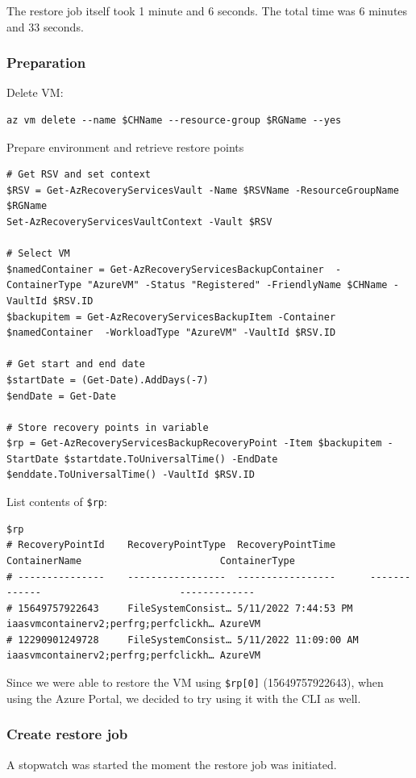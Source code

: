The restore job itself took 1 minute and 6 seconds.
The total time was 6 minutes and 33 seconds.

\subsubsection{Preparation}
\label{sec:org012927e}
Delete VM:
\begin{verbatim}
az vm delete --name $CHName --resource-group $RGName --yes
\end{verbatim}

Prepare environment and retrieve restore points
\begin{verbatim}
# Get RSV and set context
$RSV = Get-AzRecoveryServicesVault -Name $RSVName -ResourceGroupName $RGName
Set-AzRecoveryServicesVaultContext -Vault $RSV

# Select VM
$namedContainer = Get-AzRecoveryServicesBackupContainer  -ContainerType "AzureVM" -Status "Registered" -FriendlyName $CHName -VaultId $RSV.ID
$backupitem = Get-AzRecoveryServicesBackupItem -Container $namedContainer  -WorkloadType "AzureVM" -VaultId $RSV.ID

# Get start and end date
$startDate = (Get-Date).AddDays(-7)
$endDate = Get-Date

# Store recovery points in variable
$rp = Get-AzRecoveryServicesBackupRecoveryPoint -Item $backupitem -StartDate $startdate.ToUniversalTime() -EndDate $enddate.ToUniversalTime() -VaultId $RSV.ID
\end{verbatim}

List contents of \texttt{\$rp}:
\begin{verbatim}
$rp
# RecoveryPointId    RecoveryPointType  RecoveryPointTime      ContainerName                        ContainerType
# ---------------    -----------------  -----------------      -------------                        -------------
# 15649757922643     FileSystemConsist… 5/11/2022 7:44:53 PM   iaasvmcontainerv2;perfrg;perfclickh… AzureVM
# 12290901249728     FileSystemConsist… 5/11/2022 11:09:00 AM  iaasvmcontainerv2;perfrg;perfclickh… AzureVM
\end{verbatim}

Since we were able to restore the VM using \texttt{\$rp[0]} (15649757922643),
when using the Azure Portal, we decided to try using it with the CLI as well.

\subsubsection{Create restore job}
\label{sec:org58fc843}
A stopwatch was started the moment the restore job was initiated.

